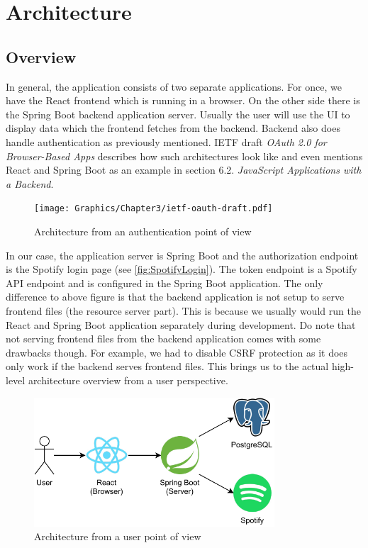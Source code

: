 \chapter{Architecture}
\label{ch:Architecture}

\section{Overview}

In general, the application consists of two separate applications. For once, we have the React frontend which is running in a browser. On the other side there is the Spring Boot backend application server. Usually the user will use the \ac{UI} to display data which the frontend fetches from the backend. Backend also does handle authentication as previously mentioned. \ac{IETF} draft \textit{OAuth 2.0 for Browser-Based Apps} describes how such architectures look like and even mentions React and Spring Boot as an example in section 6.2. \textit{JavaScript Applications with a Backend}.

\begin{figure}[bth]
    \centering
    \texttt{[image: Graphics/Chapter3/ietf-oauth-draft.pdf]}
    \caption{Architecture from an authentication point of view \cite[Section~6.2]{IetfOauthDraft}}
\end{figure}

In our case, the application server is Spring Boot and the authorization endpoint is the Spotify login page (see \autoref{fig:SpotifyLogin}). The token endpoint is a Spotify API endpoint and is configured in the Spring Boot application. The only difference to above figure is that the backend application is not setup to serve frontend files (the resource server part). This is because we usually would run the React and Spring Boot application separately during development. Do note that not serving frontend files from the backend application comes with some drawbacks though. For example, we had to disable \ac{CSRF} protection as it does only work if the backend serves frontend files. This brings us to the actual high-level architecture overview from a user perspective.

\begin{figure}[bth]
    \centering
    \includegraphics[width=0.8\textwidth]{Graphics/Chapter3/architecture-overview.pdf}
    \caption{Architecture from a user point of view}
\end{figure}

